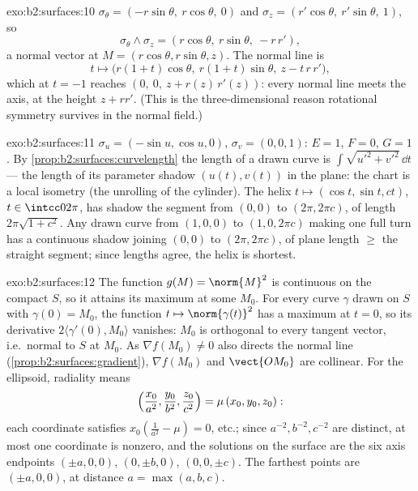 \begin{solution}{exo:b2:surfaces:10}
$\sigma_\theta = (-r\sin\theta,\ r\cos\theta,\ 0)$ and
$\sigma_z = (r'\cos\theta,\ r'\sin\theta,\ 1)$, so
\[
\sigma_\theta \wedge \sigma_z
= (r\cos\theta,\ r\sin\theta,\ -r\,r') ,
\]
a normal vector at $M = (r\cos\theta, r\sin\theta, z)$. The
normal line is
\[
t \mapsto \bigl(r(1 + t)\cos\theta,\ r(1 + t)\sin\theta,\
z - t\,r\,r'\bigr),
\]
which at $t = -1$ reaches $(0,\ 0,\ z + r(z)\,r'(z))$: every
normal line meets the axis, at the height $z + rr'$. (This is
the three-dimensional reason rotational symmetry survives in
the normal field.)
\end{solution}

\begin{solution}{exo:b2:surfaces:11}
$\sigma_u = (-\sin u, \cos u, 0)$, $\sigma_v = (0, 0, 1)$: $E
= 1$, $F = 0$, $G = 1$. By
\cref{prop:b2:surfaces:curvelength} the length of a drawn
curve is $\int\sqrt{u'^2 + v'^2}\,\dd t$ --- the length of its
parameter shadow $(u(t), v(t))$ in the plane: the chart is a
local isometry (the unrolling of the cylinder). The helix
$t \mapsto (\cos t, \sin t, ct)$, $t \in \intcc0{2\pi}$, has
shadow the segment from $(0,0)$ to $(2\pi, 2\pi c)$, of length
$2\pi\sqrt{1 + c^2}$. Any drawn curve from $(1,0,0)$ to $(1,
0, 2\pi c)$ making one full turn has a continuous shadow
joining $(0, 0)$ to $(2\pi, 2\pi c)$, of plane length $\geq$
the straight segment; since lengths agree, the helix is
shortest.
\end{solution}

\begin{solution}{exo:b2:surfaces:12}
The function $g(M) = \norm{M}^2$ is continuous on the compact
$S$, so it attains its maximum at some $M_0$. For every curve
$\gamma$ drawn on $S$ with $\gamma(0) = M_0$, the function $t
\mapsto \norm{\gamma(t)}^2$ has a maximum at $t = 0$, so its
derivative $2\langle\gamma'(0), M_0\rangle$ vanishes: $M_0$ is
orthogonal to every tangent vector, i.e.\ normal to $S$ at
$M_0$. As $\nabla f(M_0) \neq 0$ also directs the normal line
(\cref{prop:b2:surfaces:gradient}), $\nabla f(M_0)$ and
$\vect{OM_0}$ are collinear. For the ellipsoid, radiality
means
\[
\Bigl(\frac{x_0}{a^2}, \frac{y_0}{b^2},
\frac{z_0}{c^2}\Bigr) = \mu\,(x_0, y_0, z_0) :
\]
each coordinate satisfies $x_0(\frac1{a^2} - \mu) = 0$, etc.;
since $a^{-2}, b^{-2}, c^{-2}$ are distinct, at most one
coordinate is nonzero, and the solutions on the surface are
the six axis endpoints $(\pm a, 0, 0)$, $(0, \pm b, 0)$, $(0,
0, \pm c)$. The farthest points are $(\pm a, 0, 0)$, at
distance $a = \max(a,b,c)$.
\end{solution}

